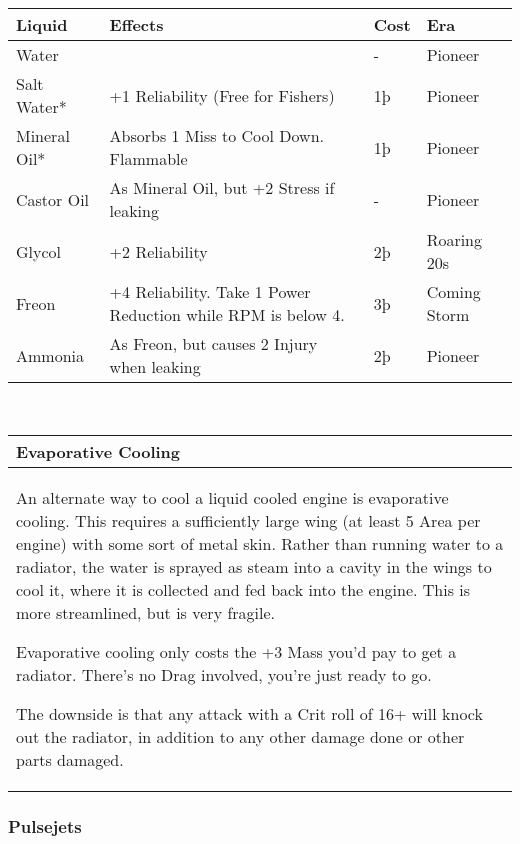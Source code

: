 \documentclass{article}
\begin{document}
\begin{tabular}{|l|l|l|l|}
    \hline
    Liquid       & Effects                                                      & Cost & Era         \\\hline
    Water        &                                                              & -    & Pioneer     \\\hline
    Salt Water*  & +1 Reliability (Free for Fishers)                            & 1þ   & Pioneer     \\\hline
    Mineral Oil* & Absorbs 1 Miss to Cool Down. Flammable                       & 1þ   & Pioneer     \\\hline
    Castor Oil   & As Mineral Oil, but +2 Stress if leaking                     & -    & Pioneer     \\\hline
    Glycol       & +2 Reliability                                               & 2þ   & Roaring 20s \\\hline
    Freon        & +4 Reliability. Take 1 Power Reduction while RPM is below 4. &
    3þ           & Coming Storm                                                                      \\\hline
    Ammonia      & As Freon, but causes 2 Injury when leaking                   & 2þ   & Pioneer     \\\hline
\end{tabular}
\\
\begin{tabular}{|l|}
    \hline
    Evaporative Cooling \\\hline

    An alternate way to cool a liquid cooled engine is evaporative cooling.
    This requires a sufficiently large wing (at least 5 Area per engine)
    with some sort of metal skin. Rather than running water to a radiator,
    the water is sprayed as steam into a cavity in the wings to cool it,
    where it is collected and fed back into the engine. This is more
    streamlined, but is very fragile.

    Evaporative cooling only costs the +3 Mass you'd pay to get a radiator.
    There's no Drag involved, you're just ready to go.

    The downside is that any attack with a Crit roll of 16+ will knock out
    the radiator, in addition to any other damage done or other parts
    damaged.            \\\hline
\end{tabular}

\subsubsection{Pulsejets}
\label{_Pulsejets}
\end{document}
